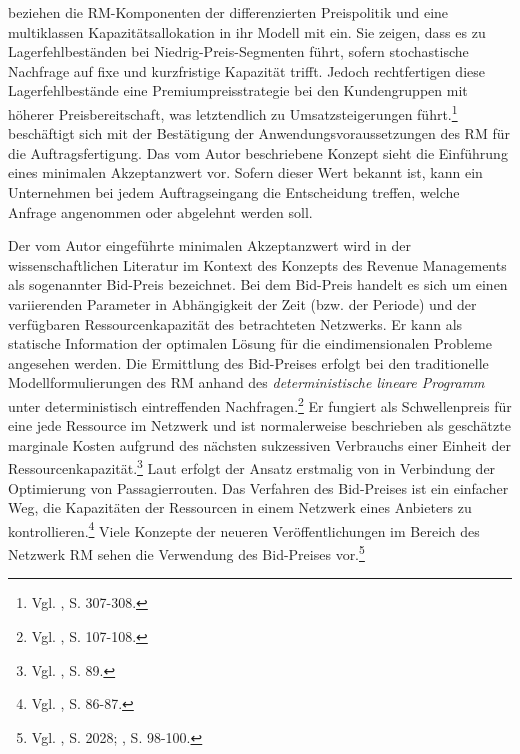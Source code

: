 \cite{deBHarris1995299} beziehen die RM-Komponenten der differenzierten Preispolitik und eine multiklassen Kapazitätsallokation in ihr Modell mit ein. Sie zeigen, dass es zu Lagerfehlbeständen bei Niedrig-Preis-Segmenten führt, sofern stochastische Nachfrage auf fixe und kurzfristige Kapazität trifft. Jedoch rechtfertigen diese Lagerfehlbestände eine Premiumpreisstrategie bei den Kundengruppen mit höherer Preisbereitschaft, was letztendlich zu Umsatzsteigerungen führt.\footnote{Vgl. \cite{deBHarris1995299}, S. 307-308.} \cite{Kalyan:2002aa} beschäftigt sich mit der Bestätigung der Anwendungsvoraussetzungen des RM für die Auftragsfertigung. Das vom Autor beschriebene Konzept sieht die Einführung eines minimalen Akzeptanzwert vor. Sofern dieser Wert bekannt ist, kann ein Unternehmen bei jedem Auftragseingang die Entscheidung treffen, welche Anfrage angenommen oder abgelehnt werden soll.

Der vom Autor \cite{Kalyan:2002aa} eingeführte minimalen Akzeptanzwert wird in der wissenschaftlichen Literatur im Kontext des Konzepts des Revenue Managements als sogenannter Bid-Preis bezeichnet. Bei dem Bid-Preis handelt es sich um einen variierenden Parameter in Abhängigkeit der Zeit (bzw. der Periode) und der verfügbaren Ressourcenkapazität des betrachteten Netzwerks. Er kann als statische Information der optimalen Lösung für die eindimensionalen Probleme angesehen werden. Die Ermittlung des Bid-Preises erfolgt bei den traditionelle Modellformulierungen des RM anhand des \textit{deterministische lineare Programm} unter deterministisch eintreffenden Nachfragen.\footnote{Vgl. \cite{talluri2004revenue}, S. 107-108.} %
Er fungiert als Schwellenpreis für eine jede Ressource im Netzwerk und ist normalerweise beschrieben als geschätzte marginale Kosten aufgrund des nächsten sukzessiven Verbrauchs einer Einheit der Ressourcenkapazität.\footnote{Vgl. \cite{talluri2004theory}, S. 89.} Laut \cite{gonsch2013using} erfolgt der Ansatz erstmalig von \cite{talluri2001airline} in Verbindung der Optimierung von Passagierrouten. Das Verfahren des Bid-Preises ist ein einfacher Weg, die Kapazitäten der Ressourcen in einem Netzwerk eines Anbieters zu kontrollieren.\footnote{Vgl. \cite{talluri2004theory}, S. 86-87\label{RMH}.} Viele Konzepte der neueren Veröffentlichungen im Bereich des Netzwerk RM sehen die Verwendung des Bid-Preises vor.\footnote{Vgl. \cite{petrick2010dynamic}, S. 2028; \cite{gonsch2013using}, S. 98-100.}

